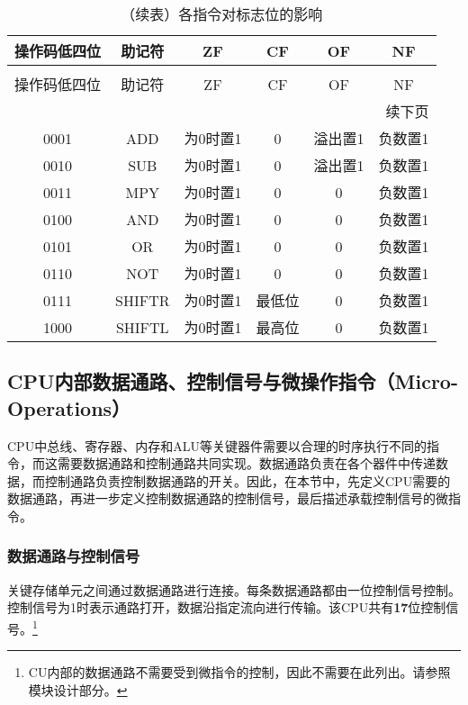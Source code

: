 \documentclass[lang=cn,a4paper,newtx]{elegantpaper}
\begin{document}
\begin{longtable}{c c c c c c }
  \caption{各指令对标志位的影响} \label{tab:ISA:flags} \\
  \toprule
  操作码低四位 & 助记符 & ZF & CF & OF & NF \\
  \midrule
  \endfirsthead
  
  \caption[]{（续表）各指令对标志位的影响} \\
  \toprule
  操作码低四位 & 助记符 & ZF & CF & OF & NF \\
  \midrule
  \endhead
  
  \midrule
  \multicolumn{6}{r}{续下页} \\
  \midrule
  \endfoot
  
  \bottomrule
  \endlastfoot
  
  0001 & ADD     & 为0时置1 & 0 & 溢出置1 & 负数置1 \\
  0010 & SUB     & 为0时置1 & 0 & 溢出置1 & 负数置1 \\
  0011 & MPY     & 为0时置1 & 0 & 0 & 负数置1 \\
  0100 & AND     & 为0时置1 & 0 & 0 & 负数置1 \\
  0101 & OR      & 为0时置1 & 0 & 0 & 负数置1 \\
  0110 & NOT     & 为0时置1 & 0 & 0 & 负数置1 \\
  0111 & SHIFTR  & 为0时置1 & 最低位 & 0 & 负数置1 \\
  1000 & SHIFTL  & 为0时置1 & 最高位 & 0 & 负数置1 \\

\end{longtable}

\subsection{CPU内部数据通路、控制信号与微操作指令（Micro-Operations）}
CPU中总线、寄存器、内存和ALU等关键器件需要以合理的时序执行不同的指令，而这需要数据通路和控制通路共同实现。数据通路负责在各个器件中传递数据，而控制通路负责控制数据通路的开关。因此，在本节中，先定义CPU需要的数据通路，再进一步定义控制数据通路的控制信号，最后描述承载控制信号的微指令。

\subsubsection{数据通路与控制信号}\label{sec:datapath}
关键存储单元之间通过数据通路进行连接。每条数据通路都由一位控制信号控制。控制信号为1时表示通路打开，数据沿指定流向进行传输。该CPU共有\textbf{17}位控制信号。\footnote{CU内部的数据通路不需要受到微指令的控制，因此不需要在此列出。请参照模块设计部分。}
\end{document}
